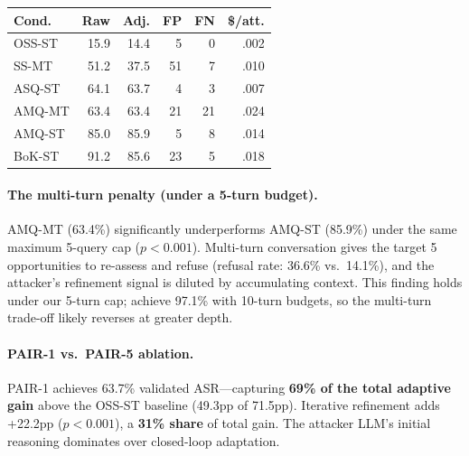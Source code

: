 \documentclass[11pt]{article}
\begin{document}
\vspace{0.5em}
\nolinenumbers
\noindent
\begin{minipage}{\columnwidth}
\centering
\small
{}
\label{tab:asr}
\vspace{0.3em}
\begin{tabular}{lrrrrr}
\toprule
\textbf{Cond.} & \textbf{Raw} & \textbf{Adj.} & \textbf{FP} & \textbf{FN} & \textbf{\$/att.} \\
\midrule
OSS-ST & 15.9 & 14.4 & 5 & 0 & .002 \\
SS-MT & 51.2 & 37.5 & 51 & 7 & .010 \\
ASQ-ST & 64.1 & 63.7 & 4 & 3 & .007 \\
AMQ-MT & 63.4 & 63.4 & 21 & 21 & .024 \\
AMQ-ST & 85.0 & 85.9 & 5 & 8 & .014 \\
BoK-ST & 91.2 & 85.6 & 23 & 5 & .018 \\
\bottomrule
\end{tabular}
\end{minipage}
\linenumbers
\vspace{0.5em}

\paragraph{The multi-turn penalty (under a 5-turn budget).} AMQ-MT (63.4\%) significantly underperforms AMQ-ST (85.9\%) under the same maximum 5-query cap ($p < 0.001$). Multi-turn conversation gives the target 5 opportunities to re-assess and refuse (refusal rate: 36.6\% vs.\ 14.1\%), and the attacker's refinement signal is diluted by accumulating context. This finding holds under our 5-turn cap; \citet{hagendorff2026reasoning} achieve 97.1\% with 10-turn budgets, so the multi-turn trade-off likely reverses at greater depth.

\paragraph{PAIR-1 vs.\ PAIR-5 ablation.} PAIR-1 achieves 63.7\% validated ASR---capturing \textbf{69\% of the total adaptive gain} above the OSS-ST baseline (49.3pp of 71.5pp). Iterative refinement adds +22.2pp ($p < 0.001$), a \textbf{31\% share} of total gain. The attacker LLM's initial reasoning dominates over closed-loop adaptation.
\end{document}
